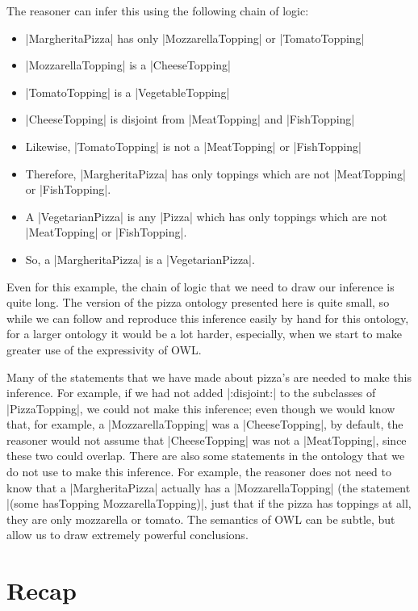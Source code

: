 The reasoner can infer this using the following chain of logic:

\begin{itemize}
\item |MargheritaPizza| has only |MozzarellaTopping| or |TomatoTopping|
\item |MozzarellaTopping| is a |CheeseTopping|
\item |TomatoTopping| is a |VegetableTopping|
\item |CheeseTopping| is disjoint from |MeatTopping| and |FishTopping|
\item Likewise, |TomatoTopping| is not a |MeatTopping| or |FishTopping|
\item Therefore, |MargheritaPizza| has only toppings which are not
  |MeatTopping| or |FishTopping|.
\item A |VegetarianPizza| is any |Pizza| which has only toppings which are not
  |MeatTopping| or |FishTopping|.
\item So, a |MargheritaPizza| is a |VegetarianPizza|.
\end{itemize}

Even for this example, the chain of logic that we need to draw our inference
is quite long. The version of the pizza ontology presented here is quite
small, so while we can follow and reproduce this inference easily by hand for
this ontology, for a larger ontology it would be a lot harder, especially,
when we start to make greater use of the expressivity of OWL.

Many of the statements that we have made about pizza's are needed to make this
inference. For example, if we had not added |:disjoint:| to the subclasses of
|PizzaTopping|, we could not make this inference; even though we would know
that, for example, a |MozzarellaTopping| was a |CheeseTopping|, by default,
the reasoner would not assume that |CheeseTopping| was not a |MeatTopping|,
since these two could overlap. There are also some statements in the ontology
that we do not use to make this inference. For example, the reasoner does not
need to know that a |MargheritaPizza| actually has a |MozzarellaTopping| (the
statement |(some hasTopping MozzarellaTopping)|, just that if the pizza has
toppings at all, they are only mozzarella or tomato. The semantics of OWL can
be subtle, but allow us to draw extremely powerful conclusions.


\section{Recap}
\label{sec:recap-1}

